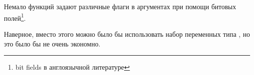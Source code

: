 \section{\BitfieldsChapter}
\label{sec:bitfields}

Немало функций задают различные флаги в аргументах при помощи битовых полей\footnote{bit fields в англоязычной литературе}.

Наверное, вместо этого можно было бы использовать набор переменных типа \Tbool, но это было бы 
не очень экономно.








